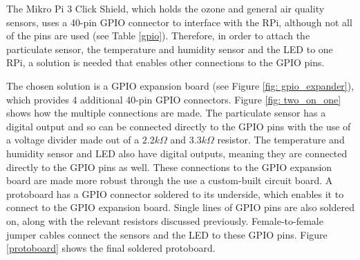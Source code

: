 \documentclass[11pt]{report}
\begin{document}
The Mikro Pi 3 Click Shield, which holds the ozone and general air quality sensors, uses a 40-pin GPIO connector to interface with the RPi, although not all of the pins are used (see Table \ref{gpio}). Therefore, in order to attach the particulate sensor, the temperature and humidity sensor and the LED to one RPi, a solution is needed that enables other connections to the GPIO pins.

The chosen solution is a GPIO expansion board (see Figure \ref{fig: gpio_expander}), which provides 4 additional 40-pin GPIO connectors. Figure \ref{fig: two_on_one} shows how the multiple connections are made. The particulate sensor has a digital output and so can be connected directly to the GPIO pins with the use of a voltage divider made out of a $2.2k\Omega$ and $3.3k\Omega$ resistor. The temperature and humidity sensor and LED also have digital outputs, meaning they are connected directly to the GPIO pins as well. These connections to the GPIO expansion board are made more robust through the use a custom-built circuit board. A protoboard has a GPIO connector soldered to its underside, which enables it to connect to the GPIO expansion board. Single lines of GPIO pins are also soldered on, along with the relevant resistors discussed previously. Female-to-female jumper cables connect the sensors and the LED to these GPIO pins. Figure \ref{protoboard} shows the final soldered protoboard.
\end{document}
